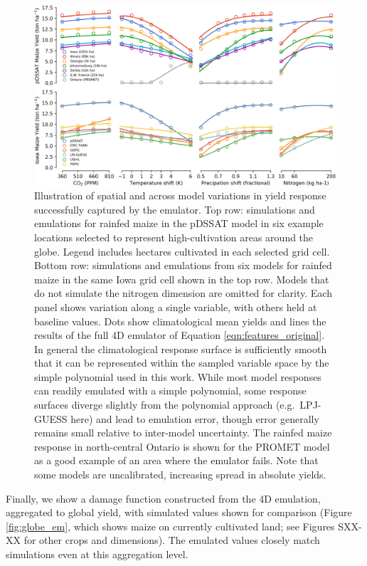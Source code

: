\begin{figure}[ht]
\centering
    \includegraphics[width=16cm]{figures/regression_example.png}
    \caption{Illustration of spatial and across model variations in yield response successfully captured by the emulator. 
    Top row: simulations and emulations for rainfed maize in the pDSSAT model in six example locations selected to represent high-cultivation areas around the globe. 
    Legend includes hectares cultivated in each selected grid cell. 
    Bottom row: simulations and emulations from six models for rainfed maize in the same Iowa grid cell shown in the top row. 
    Models that do not simulate the nitrogen dimension are omitted for clarity.
    Each panel shows variation along a single variable, with others held at baseline values. 
    Dots show climatological mean yields and lines the results of the full 4D emulator of Equation \ref{eqn:features_original}. 
    In general the climatological response surface is sufficiently smooth that it can be represented within the sampled variable space by the simple polynomial used in this work. 
    While most model responses can readily emulated with a simple polynomial, some response surfaces diverge slightly from the polynomial approach (e.g.\ LPJ-GUESS here) and lead to emulation error, though error generally remains small relative to inter-model uncertainty. 
    The rainfed maize response in north-central Ontario is shown for the PROMET model as a good example of an area where the emulator fails.
    Note that some models are uncalibrated, increasing spread in absolute yields. 
    }
   \label{fig:regression}
\end{figure}


Finally, we show a damage function constructed from the 4D emulation, aggregated to global yield, with simulated values shown for comparison (Figure \ref{fig:globe_em}, which shows maize on currently cultivated land; see Figures SXX-XX for other crops and dimensions). 
The emulated values closely match simulations even at this aggregation level.


